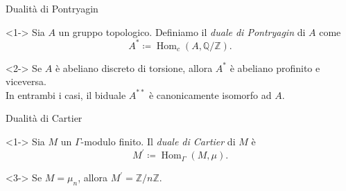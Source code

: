 \documentclass[pdf]{beamer}
\def\Q{\mathbb{Q}}
\def\Z{\mathbb{Z}}
\def\K{K}
\def\Ks{\overline{\K}}
\def\Zn{\Z/n\Z}
\DeclareMathOperator{\Hom}{Hom}
\theoremstyle{remark}
\begin{document}
\begin{frame}{Dualità di Pontryagin}
	\begin{definition}<1->
		Sia $A$ un gruppo topologico. Definiamo il \textit{duale di Pontryagin} di $A$ come
		\[
			A^*\coloneqq\Hom_{c}{(A,\Q/\Z)}
			.\]
	\end{definition}

	\begin{theorem}<2->
		Se $A$ è abeliano discreto di torsione, allora $A^*$ è abeliano profinito e viceversa.\\
		In entrambi i casi, il biduale $A^{**}$ è canonicamente isomorfo ad $A$.
	\end{theorem}
\end{frame}

\begin{frame}{Dualità di Cartier}
	\begin{definition}<1->
		Sia $M$ un $\Gamma$-modulo finito. Il \textit{duale di Cartier} di $M$ è
		\[
			M^\prime \coloneqq \Hom_{\Gamma}(M, \mu)
			.\]
	\end{definition}


	\begin{example}<3->
		Se $M=\mu_n$, allora $M^\prime=\Zn$.
	\end{example}
\end{frame}
\end{document}
